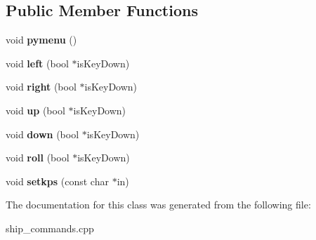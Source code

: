 \subsection*{Public Member Functions}
\begin{DoxyCompactItemize}
\item 
void {\bfseries pymenu} ()\hypertarget{classShipCommands_a94d43676b2ad2777ba1cf33754b8f162}{}\label{classShipCommands_a94d43676b2ad2777ba1cf33754b8f162}

\item 
void {\bfseries left} (bool $\ast$is\+Key\+Down)\hypertarget{classShipCommands_a5db818215a6bae097da99db3c61b3d31}{}\label{classShipCommands_a5db818215a6bae097da99db3c61b3d31}

\item 
void {\bfseries right} (bool $\ast$is\+Key\+Down)\hypertarget{classShipCommands_a39c1630d48b698fb262d36e1b88f484d}{}\label{classShipCommands_a39c1630d48b698fb262d36e1b88f484d}

\item 
void {\bfseries up} (bool $\ast$is\+Key\+Down)\hypertarget{classShipCommands_a0069243eeeee42eb787b19ba7657e644}{}\label{classShipCommands_a0069243eeeee42eb787b19ba7657e644}

\item 
void {\bfseries down} (bool $\ast$is\+Key\+Down)\hypertarget{classShipCommands_a94bde419c986de12cf09eb70cc965b59}{}\label{classShipCommands_a94bde419c986de12cf09eb70cc965b59}

\item 
void {\bfseries roll} (bool $\ast$is\+Key\+Down)\hypertarget{classShipCommands_a25d972141cdda97a6af9686e5d2396bf}{}\label{classShipCommands_a25d972141cdda97a6af9686e5d2396bf}

\item 
void {\bfseries setkps} (const char $\ast$in)\hypertarget{classShipCommands_add3a3a55179d37d78e01a98667fbcbfe}{}\label{classShipCommands_add3a3a55179d37d78e01a98667fbcbfe}

\end{DoxyCompactItemize}


The documentation for this class was generated from the following file\+:\begin{DoxyCompactItemize}
\item 
ship\+\_\+commands.\+cpp\end{DoxyCompactItemize}
